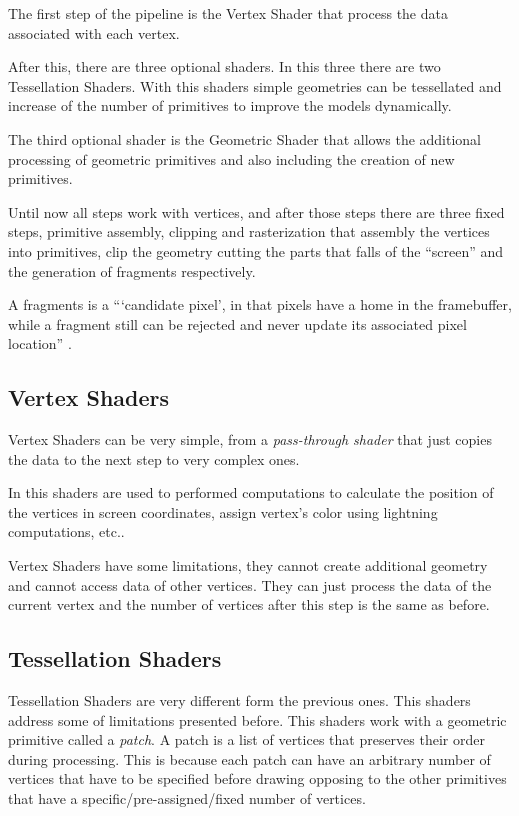 The first step of the pipeline is the Vertex Shader that process the data associated with each vertex. 

After this, there are three optional shaders. In this three there are two Tessellation Shaders. With this shaders simple geometries can be tessellated and increase of the number of primitives to improve the models dynamically.

The third optional shader is the Geometric Shader that allows the additional processing of geometric primitives and also including the creation of new primitives.

Until now all steps work with vertices, and after those steps there are three fixed steps, primitive assembly, clipping and rasterization that assembly the vertices into primitives, clip the geometry cutting the parts that falls of the ``screen'' and the generation of fragments respectively.

A fragments is a ``‘candidate pixel’, in that pixels have a home in the framebuffer, while a fragment still can be rejected and never update its associated pixel location'' \cite{shreiner2013opengl}.
\subsection{Vertex Shaders} %
\label{sub:vertex_shaders}
Vertex Shaders can be very simple, from a \emph{pass-through shader} that just copies the data to the next step to very complex ones.

In this shaders are used to performed computations to calculate the position of the vertices in screen coordinates, assign vertex's color using lightning computations, etc..

Vertex Shaders have some limitations, they cannot create additional geometry and cannot access data of other vertices. They can just process the data of the current vertex and the number of vertices after this step is the same as before.


\subsection{Tessellation Shaders} %
\label{sub:tesselation_shaders}
Tessellation Shaders are very different form the previous ones. This shaders address some of limitations presented before.
This shaders work with a geometric primitive called a \emph{patch}. A patch is a list of vertices that preserves their order during processing. This is because each patch can have an arbitrary number of vertices that have to be specified before drawing opposing to the other primitives that have a specific/pre-assigned/fixed number of vertices.


